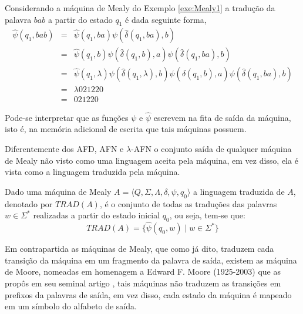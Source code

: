 \begin{example}
	Considerando a máquina de Mealy do Exemplo \ref{exe:Mealy1} a tradução da palavra $bab$ a partir do estado $q_1$ é dada seguinte forma,
	\begin{eqnarray*}
		\widehat{\psi}(q_1, bab) & = & \widehat{\psi}(q_1, ba)\psi(\widehat{\delta}(q_1, ba), b)\\
		& = & \widehat{\psi}(q_1, b)\psi(\widehat{\delta}(q_1, b), a)\psi(\widehat{\delta}(q_1, ba), b)\\
		& = & \widehat{\psi}(q_1, \lambda)\psi(\widehat{\delta}(q_1, \lambda), b)\psi(\widehat{\delta}(q_1, b), a)\psi(\widehat{\delta}(q_1, ba), b)\\
		& = & \lambda 021220\\
		& = & 021220
	\end{eqnarray*}
\end{example}

\begin{remark}
	Pode-se interpretar que as funções $\psi$ e $\widehat{\psi}$ escrevem na fita de saída da máquina, isto é, na memória adicional de escrita que tais máquinas possuem.
\end{remark}

Diferentemente dos AFD, AFN e $\lambda$-AFN o conjunto saída de qualquer máquina de Mealy não visto como uma linguagem aceita pela máquina, em vez disso, ela é vista como a linguagem traduzida pela máquina.

\begin{definition}
	Dado uma máquina de Mealy $A = \langle Q, \Sigma, \Lambda, \delta, \psi, q_0\rangle$ a linguagem traduzida de $A$, denotado por $TRAD(A)$, é o conjunto de todas as traduções das palavras $w \in \Sigma^*$ realizadas a partir do estado inicial $q_0$, ou seja, tem-se que:
	\begin{equation}
		TRAD(A) = \{\widehat{\psi}(q_0, w)  \mid w \in \Sigma^*\}
	\end{equation}
\end{definition}

Em contrapartida as máquinas de Mealy, que como já dito, traduzem cada transição da máquina em um fragmento da palavra de saída, existem as máquina de Moore, nomeadas em homenagem a Edward F. Moore (1925-2003) que as propôs em seu seminal artigo \cite{moore1956}, tais máquinas não traduzem as transições em prefixos da palavras de saída, em vez disso, cada estado da máquina é mapeado em um símbolo do alfabeto de saída.

